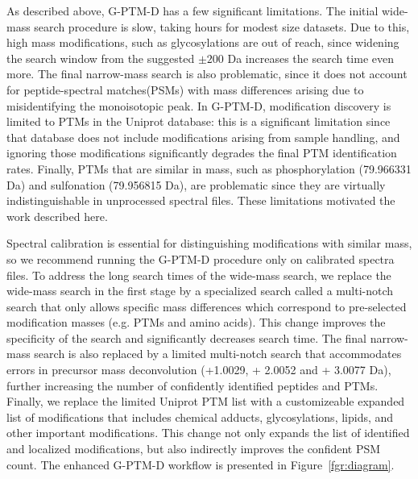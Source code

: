 \documentclass[journal=jprobs,manuscript=article]{achemso}
\begin{document}
As described above, G-PTM-D has a few significant limitations.
The initial wide-mass search procedure is slow, taking hours for modest size datasets.
Due to this, high mass modifications, such as glycosylations are out of reach, since widening the search window from the suggested $\pm 200$ Da increases the search time even more.
The final narrow-mass search is also problematic, since it does not account for peptide-spectral matches(PSMs) with mass differences arising due to misidentifying the monoisotopic peak.
In G-PTM-D, modification discovery is limited to PTMs in the Uniprot database: this is a significant limitation since that database does not include modifications arising from sample handling, and ignoring those modifications significantly degrades the final PTM identification rates.
Finally, PTMs that are similar in mass, such as phosphorylation (79.966331 Da) and sulfonation (79.956815 Da), are problematic since they are virtually indistinguishable in unprocessed spectral files.
These limitations motivated the work described here.

Spectral calibration is essential for distinguishing modifications with similar mass, so we recommend running the G-PTM-D procedure only on calibrated spectra files.
To address the long search times of the wide-mass search, we replace the wide-mass search in the first stage by a specialized search called a multi-notch search that only allows specific mass differences which correspond to pre-selected modification masses (e.g. PTMs and amino acids).
This change improves the specificity of the search and significantly decreases search time.
The final narrow-mass search is also replaced by a limited multi-notch search that accommodates errors in precursor mass deconvolution (+1.0029, + 2.0052 and + 3.0077 Da), further increasing the number of confidently identified peptides and PTMs.
Finally, we replace the limited Uniprot PTM list with a customizeable expanded list of modifications that includes chemical adducts, glycosylations, lipids, and other important modifications.
This change not only expands the list of identified and localized modifications, but also indirectly improves the confident PSM count.
The enhanced G-PTM-D workflow is presented in Figure~\ref{fgr:diagram}.
\end{document}
